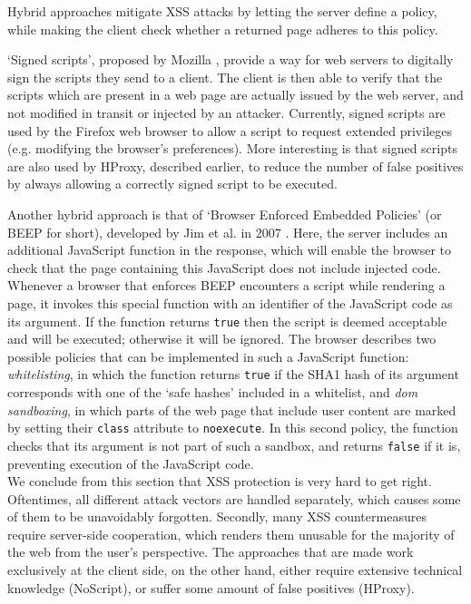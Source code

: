 Hybrid approaches mitigate XSS attacks by letting the server define a policy, while making the client check whether a returned page adheres to this policy.

`Signed scripts', proposed by Mozilla \cite{SignedScripts}, provide a way for web servers to digitally sign the scripts they send to a client. The client is then able to verify that the scripts which are present in a web page are actually issued by the web server, and not modified in transit or injected by an attacker. Currently, signed scripts are used by the Firefox web browser to allow a script to request extended privileges (e.g. modifying the browser's preferences). More interesting is that signed scripts are also used by HProxy, described earlier, to reduce the number of false positives by always allowing a correctly signed script to be executed.

Another hybrid approach is that of `Browser Enforced Embedded Policies' (or BEEP for short), developed by Jim et al. in 2007 \cite{Jim2007}. Here, the server includes an additional JavaScript function in the response, which will enable the browser to check that the page containing this JavaScript does not include injected code. Whenever a browser that enforces BEEP encounters a script while rendering a page, it invokes this special function with an identifier of the JavaScript code as its argument. If the function returns \texttt{true} then the script is deemed acceptable and will be executed; otherwise it will be ignored. The browser describes two possible policies that can be implemented in such a JavaScript function: \emph{whitelisting}, in which the function returns \texttt{true} if the SHA1 hash of its argument corresponds with one of the `safe hashes' included in a whitelist, and \emph{\gls{dom} sandboxing}, in which parts of the web page that include user content are marked by setting their \texttt{class} attribute to \texttt{noexecute}. In this second policy, the function checks that its argument is not part of such a sandbox, and returns \texttt{false} if it is, preventing execution of the JavaScript code.\\

We conclude from this section that XSS protection is very hard to get right. Oftentimes, all different attack vectors are handled separately, which causes some of them to be unavoidably forgotten. Secondly, many XSS countermeasures require server-side cooperation, which renders them unusable for the majority of the web from the user's perspective. The approaches that are made work exclusively at the client side, on the other hand, either require extensive technical knowledge (NoScript), or suffer some amount of false positives (HProxy).

